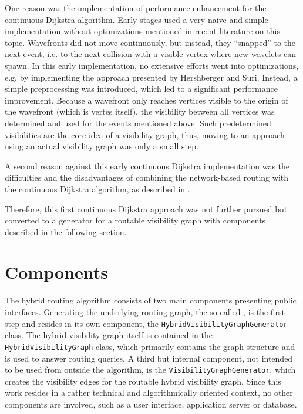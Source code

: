 		One reason was the implementation of performance enhancement for the continuous Dijkstra algorithm.
		Early stages used a very naive and simple implementation without optimizations mentioned in recent literature on this topic.
		Wavefronts did not move continuously, but instead, they \enquote{snapped} to the next event, i.e. to the next collision with a visible vertex where new wavelets can spawn.
		In this early implementation, no extensive efforts went into optimizations, e.g. by implementing the approach presented by Hershberger and Suri\cite{hershberger-suri}.
		Instead, a simple preprocessing was introduced, which led to a significant performance improvement.
		Because a wavefront only reaches vertices visible to the origin of the wavefront (which is vertes itself), the visibility between all vertices was determined and used for the events mentioned above.
		Such predetermined visibilities are the core idea of a visibility graph, thus, moving to an approach using an actual visibility graph was only a small step.
		
		A second reason against this early continuous Dijkstra implementation was the difficulties and the disadvantages of combining the network-based routing with the continuous Dijkstra algorithm, as described in .
		
		Therefore, this first continuous Dijkstra approach was not further pursued but converted to a generator for a routable visibility graph with components described in the following section.
	
\section{Components}
\label{sec:components}

	The hybrid routing algorithm consists of two main components presenting public interfaces.
	Generating the underlying routing graph, the so-called , is the first step and resides in its own component, the \texttt{HybridVisibilityGraphGenerator} class.
	The hybrid visibility graph itself is contained in the \texttt{HybridVisibilityGraph} class, which primarily contains the graph structure and is used to answer routing queries.
	A third but internal component, not intended to be used from outside the algorithm, is the \texttt{VisibilityGraphGenerator}, which creates the visibility edges for the routable hybrid visibility graph.
	Since this work resides in a rather technical and algorithmically oriented context, no other components are involved, such as a user interface, application server or database.
	
